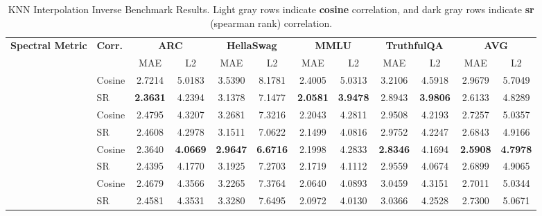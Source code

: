\begin{table}[t!]
\centering
\small
\setlength{\tabcolsep}{3pt} 
\caption{KNN Interpolation Inverse Benchmark Results. Light gray rows indicate \textbf{cosine} correlation, and dark gray rows indicate \textbf{sr} (spearman rank) correlation. }
\label{tab:knn_benchmark}
\begin{tabular}{llcccccccccc}
\toprule
\multirow{2}{*}{\textbf{Spectral Metric}} & \multirow{2}{*}{\textbf{Corr.}} & \multicolumn{2}{c}{\textbf{ARC}} & \multicolumn{2}{c}{\textbf{HellaSwag}} & \multicolumn{2}{c}{\textbf{MMLU}} & \multicolumn{2}{c}{\textbf{TruthfulQA}} & \multicolumn{2}{c}{\textbf{AVG}} \\
\cmidrule(lr){3-4} \cmidrule(lr){5-6} \cmidrule(lr){7-8} \cmidrule(lr){9-10} \cmidrule(lr){11-12}
& & MAE & L2 & MAE & L2 & MAE & L2 & MAE & L2 & MAE & L2 \\
\midrule

\rowcolor{lightgray}
\cellcolor{white} & Cosine & 2.7214 & 5.0183 & 3.5390 & 8.1781 & 2.4005 & 5.0313 & 3.2106 & 4.5918 & 2.9679 & 5.7049 \\
\rowcolor{gray!40}\cellcolor{white}
\multirow{-2}{*}{\textbf{\LOGALPHANORM}} & SR & \textbf{2.3631} & 4.2394 & 3.1378 & 7.1477 & \textbf{2.0581} & \textbf{3.9478} & 2.8943 & \textbf{3.9806} & 2.6133 & 4.8289 \\

\midrule

\rowcolor{lightgray}
\cellcolor{white} & Cosine & 2.4795 & 4.3207 & 3.2681 & 7.3216 & 2.2043 & 4.2811 & 2.9508 & 4.2193 & 2.7257 & 5.0357 \\
\rowcolor{gray!40}\cellcolor{white}
\multirow{-2}{*}{\textbf{\SPECTRALNORM}} & SR & 2.4608 & 4.2978 & 3.1511 & 7.0622 & 2.1499 & 4.0816 & 2.9752 & 4.2247 & 2.6843 & 4.9166 \\

\midrule

\rowcolor{lightgray}
\cellcolor{white} & Cosine & 2.3640 & \textbf{4.0669} & \textbf{2.9647} & \textbf{6.6716} & 2.1998 & 4.2833 & \textbf{2.8346} & 4.1694 & \textbf{2.5908} & \textbf{4.7978} \\
\rowcolor{gray!40}\cellcolor{white}
\multirow{-2}{*}{\textbf{\STABLERANK}} & SR & 2.4395 & 4.1770 & 3.1925 & 7.2703 & 2.1719 & 4.1112 & 2.9559 & 4.0674 & 2.6899 & 4.9065 \\

\midrule

\rowcolor{lightgray}
\cellcolor{white} & Cosine & 2.4679 & 4.3566 & 3.2265 & 7.3764 & 2.0640 & 4.0893 & 3.0459 & 4.3151 & 2.7011 & 5.0344 \\
\rowcolor{gray!40}\cellcolor{white}
\multirow{-2}{*}{\textbf{\ALPHAHILL}} & SR & 2.4581 & 4.3531 & 3.3280 & 7.6495 & 2.0972 & 4.0130 & 3.0366 & 4.2528 & 2.7300 & 5.0671 \\

\bottomrule
\end{tabular}
\label{tab:prediction}
\end{table}
